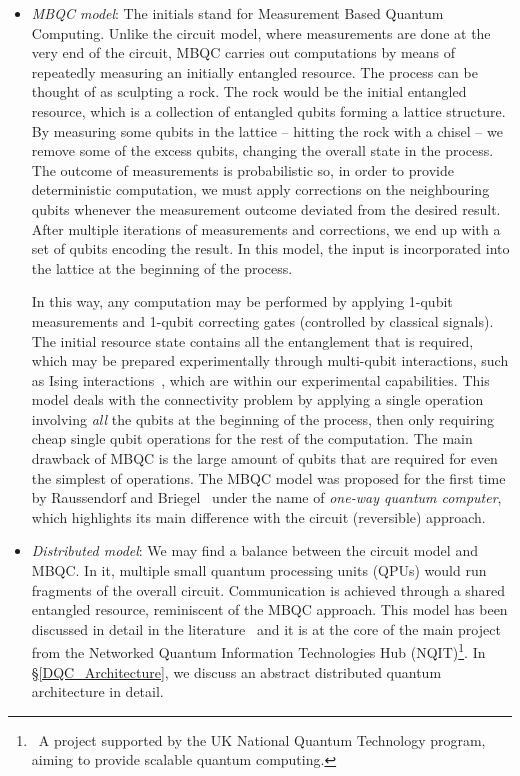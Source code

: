 \begin{itemize}
  \item \textit{MBQC model}: The initials stand for Measurement Based Quantum Computing. Unlike the circuit model, where measurements are done at the very end of the circuit, MBQC carries out computations by means of repeatedly measuring an initially entangled resource. The process can be thought of as sculpting a rock. The rock would be the initial entangled resource, which is a collection of entangled qubits forming a lattice structure. By measuring some qubits in the lattice -- hitting the rock with a chisel -- we remove some of the excess qubits, changing the overall state in the process. The outcome of measurements is probabilistic so, in order to provide deterministic computation, we must apply corrections on the neighbouring qubits whenever the measurement outcome deviated from the desired result. After multiple iterations of measurements and corrections, we end up with a set of qubits encoding the result. In this model, the input is incorporated into the lattice at the beginning of the process.

  In this way, any computation may be performed by applying 1-qubit measurements and 1-qubit correcting gates (controlled by classical signals). The initial resource state contains all the entanglement that is required, which may be prepared experimentally through multi-qubit interactions, such as Ising interactions~\citep{1WQC}, which are within our experimental capabilities. This model deals with the connectivity problem by applying a single operation involving \textit{all} the qubits at the beginning of the process, then only requiring cheap single qubit operations for the rest of the computation. The main drawback of MBQC is the large amount of qubits that are required for even the simplest of operations. The MBQC model was proposed for the first time by Raussendorf and Briegel~\citep{1WQC} under the name of \textit{one-way quantum computer}, which highlights its main difference with the circuit (reversible) approach. 

  \item \textit{Distributed model}: We may find a balance between the circuit model and MBQC. In it, multiple small quantum processing units (QPUs) would run fragments of the overall circuit. Communication is achieved through a shared entangled resource, reminiscent of the MBQC approach. This model has been discussed in detail in the literature~\citep{DistributedQCHW} and it is at the core of the main project from the Networked Quantum Information Technologies Hub (NQIT)\footnote{\, A project supported by the UK National Quantum Technology program, aiming to provide scalable quantum computing.}. In \S\ref{DQC_Architecture}, we discuss an abstract distributed quantum architecture in detail.

\end{itemize}


